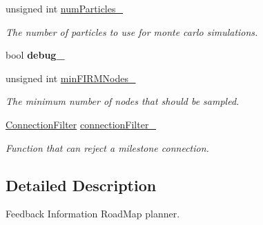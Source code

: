 \begin{DoxyCompactItemize}
\item 
\hypertarget{class_f_i_r_m_a17cff52eb2c31715ab8341b9daea1a3f}{unsigned int \hyperlink{class_f_i_r_m_a17cff52eb2c31715ab8341b9daea1a3f}{num\-Particles\-\_\-}}\label{class_f_i_r_m_a17cff52eb2c31715ab8341b9daea1a3f}

\begin{DoxyCompactList}\small\item\em \-The number of particles to use for monte carlo simulations. \end{DoxyCompactList}\item 
\hypertarget{class_f_i_r_m_a7fc88496b950b90b92876dea03b3102f}{bool {\bfseries debug\-\_\-}}\label{class_f_i_r_m_a7fc88496b950b90b92876dea03b3102f}

\item 
\hypertarget{class_f_i_r_m_add9de6c5accdea0f9b6d1ff458350036}{unsigned int \hyperlink{class_f_i_r_m_add9de6c5accdea0f9b6d1ff458350036}{min\-F\-I\-R\-M\-Nodes\-\_\-}}\label{class_f_i_r_m_add9de6c5accdea0f9b6d1ff458350036}

\begin{DoxyCompactList}\small\item\em \-The minimum number of nodes that should be sampled. \end{DoxyCompactList}\item 
\hypertarget{class_f_i_r_m_a0ad7ac389f9e8b0e483826833c32da95}{\hyperlink{class_f_i_r_m_a2482eee2e5248d5bff3b3b56e5a593b3}{\-Connection\-Filter} \hyperlink{class_f_i_r_m_a0ad7ac389f9e8b0e483826833c32da95}{connection\-Filter\-\_\-}}\label{class_f_i_r_m_a0ad7ac389f9e8b0e483826833c32da95}

\begin{DoxyCompactList}\small\item\em \-Function that can reject a milestone connection. \end{DoxyCompactList}\end{DoxyCompactItemize}


\subsection{\-Detailed \-Description}
\-Feedback \-Information \-Road\-Map planner. 

